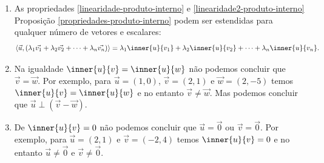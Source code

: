 \begin{observacao}
  \begin{enumerate}
    \item As propriedades \ref{linearidade-produto-interno} e \ref{linearidade2-produto-interno} Proposição \ref{propriedades-produto-interno} podem ser estendidas para qualquer número de vetores e escalares:
    \[
      \langle\vec{u}, (\lambda_1\vec{v_1} + \lambda_2\vec{v_2} + \cdots + \lambda_n\vec{v_n} )\rangle = \lambda_1\inner{u}{v_1} + \lambda_2\inner{u}{v_2} + \cdots + \lambda_n\inner{u}{v_n}.
    \]
    \item Na igualdade $\inner{u}{v} = \inner{u}{w}$ não podemos concluir que $\vec{v} = \vec{w}$. Por exemplo, para $\vec{u} = (1, 0)$, $\vec{v} = (2, 1)$ e $\vec{w} = (2, -5)$ temos $\inner{u}{v} = \inner{u}{w}$ e no entanto $\vec{v} \ne \vec{w}$. Mas podemos concluir que $\vec{u}\perp(\vec{v} - \vec{w})$.
    \item De $\inner{u}{v} = 0$ não podemos concluir que $\vec{u} = \vec{0}$ ou $\vec{v} = \vec{0}$. Por exemplo, para $\vec{u} = (2, 1)$ e $\vec{v} = (-2, 4)$ temos $\inner{u}{v} = 0$ e no entanto $\vec{u} \ne \vec{0}$ e $\vec{v} \ne \vec{0}$.
  \end{enumerate}
\end{observacao}

